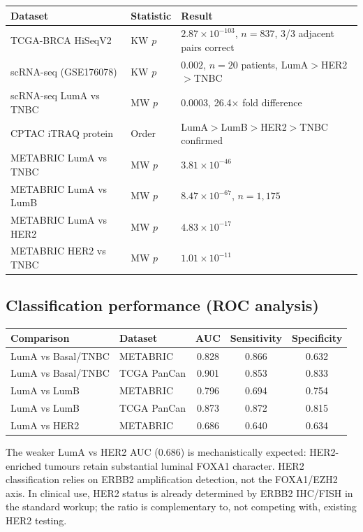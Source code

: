 \documentclass[12pt, a4paper]{article}
\begin{document}
\begin{center}
\begin{tabular}{p{4.5cm}p{1.5cm}p{6cm}}
\toprule
\textbf{Dataset} & \textbf{Statistic} & \textbf{Result} \\
\midrule
TCGA-BRCA HiSeqV2 & KW $p$ & $2.87 \times 10^{-103}$,
$n=837$, 3/3 adjacent pairs correct \\
scRNA-seq (GSE176078) & KW $p$ & $0.002$, $n=20$ patients,
LumA$>$HER2$>$TNBC \\
scRNA-seq LumA vs TNBC & MW $p$ & $0.0003$, 26.4$\times$
fold difference \\
CPTAC iTRAQ protein & Order & LumA$>$LumB$>$HER2$>$TNBC
confirmed \\
METABRIC LumA vs TNBC & MW $p$ & $3.81 \times 10^{-46}$ \\
METABRIC LumA vs LumB & MW $p$ & $8.47 \times 10^{-67}$,
$n=1{,}175$ \\
METABRIC LumA vs HER2 & MW $p$ & $4.83 \times 10^{-17}$ \\
METABRIC HER2 vs TNBC & MW $p$ & $1.01 \times 10^{-11}$ \\
\bottomrule
\end{tabular}
\end{center}

\subsection{Classification performance (ROC analysis)}

\begin{center}
\begin{tabular}{llccc}
\toprule
\textbf{Comparison} & \textbf{Dataset}
& \textbf{AUC} & \textbf{Sensitivity}
& \textbf{Specificity} \\
\midrule
LumA vs Basal/TNBC & METABRIC & 0.828 & 0.866 & 0.632 \\
LumA vs Basal/TNBC & TCGA PanCan & 0.901 & 0.853 & 0.833 \\
LumA vs LumB       & METABRIC & 0.796 & 0.694 & 0.754 \\
LumA vs LumB       & TCGA PanCan & 0.873 & 0.872 & 0.815 \\
LumA vs HER2       & METABRIC & 0.686 & 0.640 & 0.634 \\
\bottomrule
\end{tabular}
\end{center}

\noindent The weaker LumA vs HER2 AUC ($0.686$) is
mechanistically expected: HER2-enriched tumours retain
substantial luminal FOXA1 character. HER2 classification
relies on ERBB2 amplification detection, not the FOXA1/EZH2
axis. In clinical use, HER2 status is already determined
by ERBB2 IHC/FISH in the standard workup; the ratio is
complementary to, not competing with, existing HER2 testing.
\end{document}
